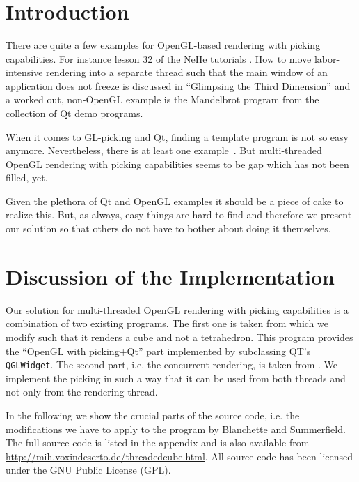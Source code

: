 \documentclass[jou,noapacite]{apa}
\title{
\mytitle
}
\begin{document}
\maketitle
%
%
\section{Introduction}
\label{sec:Introduction}

There are quite a few examples for OpenGL-based rendering with picking
capabilities.
%
For instance lesson 32 of the NeHe tutorials \cite{nehe32}.
%
How to move labor-intensive rendering into a separate thread such that the main
window of an application does not freeze is discussed in ``Glimpsing the Third
Dimension'' \cite{glimpse3d} and a worked out, non-OpenGL example is the
Mandelbrot program from the collection of Qt demo programs.

When it comes to GL-picking and Qt, finding a template program is not so easy
anymore.
%
Nevertheless, there is at least one example~\cite{Blanchette2008}.
%
But multi-threaded OpenGL rendering with picking capabilities seems to be gap
which has not been filled, yet.

Given the plethora of Qt and OpenGL examples it should be a piece of cake to
realize this.
%
But, as always, easy things are hard to find and therefore we present our
solution so that others do not have to bother about doing it themselves.




\section{Discussion of the Implementation}

Our solution for multi-threaded OpenGL rendering with picking capabilities is a
combination of two existing programs.
%
The first one is taken from \cite[chapter 8]{Blanchette2008} which we modify
such that it renders a cube and not a tetrahedron. This program provides the
``OpenGL with picking+Qt'' part implemented 
by subclassing QT's \lstinline|QGLWidget|.
%
The second part, i.e. the concurrent rendering, is taken from \cite{glimpse3d}.
%
We implement the picking in such a way that it can be used from both threads
and not only from the rendering thread.


In the following we show the crucial parts of the source code, i.e. the
modifications we have to apply to the program by Blanchette and Summerfield.
%
The full source code is listed in the appendix and is also available from
\url{http://mih.voxindeserto.de/threadedcube.html}. All source code has been
licensed under the GNU Public License (GPL).
\end{document}
